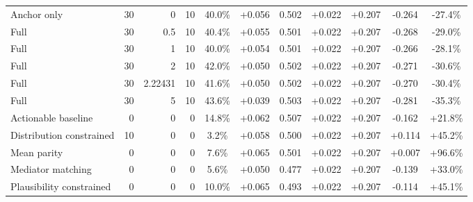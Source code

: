 \begin{table}[htbp]
\begin{tabular}{lrrrccccccc}
Anchor only & 30 & 0 & 10 & 40.0\% & +0.056 & 0.502 & +0.022 & +0.207 & -0.264 & -27.4\% \\
Full & 30 & 0.5 & 10 & 40.4\% & +0.055 & 0.501 & +0.022 & +0.207 & -0.268 & -29.0\% \\
Full & 30 & 1 & 10 & 40.0\% & +0.054 & 0.501 & +0.022 & +0.207 & -0.266 & -28.1\% \\
Full & 30 & 2 & 10 & 42.0\% & +0.050 & 0.502 & +0.022 & +0.207 & -0.271 & -30.6\% \\
Full & 30 & 2.22431 & 10 & 41.6\% & +0.050 & 0.502 & +0.022 & +0.207 & -0.270 & -30.4\% \\
Full & 30 & 5 & 10 & 43.6\% & +0.039 & 0.503 & +0.022 & +0.207 & -0.281 & -35.3\% \\
Actionable baseline & 0 & 0 & 0 & 14.8\% & +0.062 & 0.507 & +0.022 & +0.207 & -0.162 & +21.8\% \\
Distribution constrained & 10 & 0 & 0 & 3.2\% & +0.058 & 0.500 & +0.022 & +0.207 & +0.114 & +45.2\% \\
Mean parity & 0 & 0 & 0 & 7.6\% & +0.065 & 0.501 & +0.022 & +0.207 & +0.007 & +96.6\% \\
Mediator matching & 0 & 0 & 0 & 5.6\% & +0.050 & 0.477 & +0.022 & +0.207 & -0.139 & +33.0\% \\
Plausibility constrained & 0 & 0 & 0 & 10.0\% & +0.065 & 0.493 & +0.022 & +0.207 & -0.114 & +45.1\% \\
\bottomrule
\end{tabular}
\end{table}